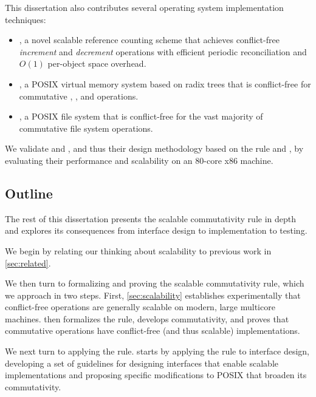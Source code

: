 \noindent
This dissertation also contributes several operating system
implementation techniques:

\begin{itemize}

\item {}, a novel scalable reference counting scheme that
  achieves conflict-free \emph{increment} and \emph{decrement}
  operations with efficient periodic reconciliation and $O(1)$
  per-object space overhead.

\item \vm, a POSIX virtual memory system based on radix trees that is
  conflict-free for commutative , , and
   operations.

\item \fs, a POSIX file system that is conflict-free for the vast
  majority of commutative file system operations.

\end{itemize}

\noindent
We validate \vm and \fs, and thus their design methodology based on
the rule and \tool, by evaluating their performance and scalability on
an 80-core x86 machine.


\subsection{Outline}

The rest of this dissertation presents the scalable commutativity rule
in depth and explores its consequences from interface design to
implementation to testing.

We begin by relating our thinking about scalability to previous work
in \cref{sec:related}.

We then turn to formalizing and proving the scalable commutativity
rule, which we approach in two steps.  First, \cref{sec:scalability}
establishes experimentally that conflict-free operations are generally
scalable on modern, large multicore machines.   then
formalizes the rule, develops \SIM commutativity, and proves that
commutative operations have conflict-free (and thus scalable)
implementations.

We next turn to applying the rule.   starts by
applying the rule to interface design, developing a set of guidelines
for designing interfaces that enable scalable implementations and
proposing specific modifications to POSIX that broaden its
commutativity.

